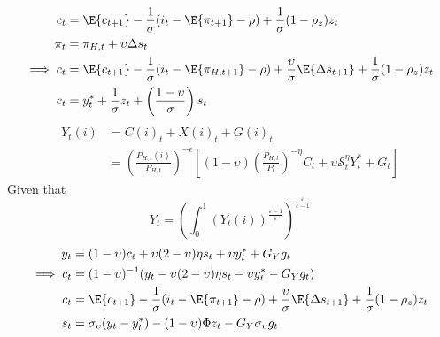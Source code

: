 \pagebreak
\begin{align}
    c_t &= \E\{ c_{t+1}\} - \frac{1}{\sigma}(i_t - \E \{ \pi_{t+1}\} - \rho) + \frac{1}{\sigma}(1-\rho_z)z_t\\
    \pi_t &= \pi_{H,t} + \upsilon \Delta s_t\\
    \implies c_t &= \E\{ c_{t+1}\} - \frac{1}{\sigma}(i_t - \E \{ \pi_{H,t+1}\} - \rho) + \frac{\upsilon}{\sigma}\E \{ \Delta s_{t+1} \} + \frac{1}{\sigma}(1-\rho_z)z_t\\
    c_t &= y_t^* + \frac{1}{\sigma}z_t + \left(\frac{1-\upsilon}{\sigma}\right)s_t
\end{align}
\begin{align}
    Y_{t}(i) &= C(i)_t + X(i)_{t} + G(i)_t \\
&=\left(\frac{P_{H,t}(i)}{P_{H,t}}\right)^{-\epsilon}\left[ (1-\upsilon)\left(\frac{P_{H,t}}{P_t}\right)^{-\eta}C_t + \upsilon \mathcal{S}_t^{\eta}Y_t^* + G_t\right]
\end{align}
Given that
\begin{equation}
    Y_t = \left( \int_{0}^{1} (Y_t(i))^{\frac{\varepsilon-1}{\varepsilon}}\right)^{\frac{\varepsilon}{\varepsilon-1}}
\end{equation}
\begin{align}
    y_t &= (1-\upsilon)c_t + \upsilon(2-\upsilon)\eta s_t + \upsilon y_t^* + G_Y g_t\\
    \implies c_t &= (1-\upsilon)^{-1}(y_t - \upsilon(2-\upsilon)\eta s_t - \upsilon y_t^* - G_Y g_t)\\
    c_t &= \E \{ c_{t+1}\} - \frac{1}{\sigma}(i_t - \E \{ \pi_{t+1}\} - \rho) + \frac{\upsilon}{\sigma}\E \{ \Delta s_{t+1} \} + \frac{1}{\sigma}(1-\rho_z)z_t \\
    s_t &= \sigma_\upsilon(y_t - y^*_t) - (1-\upsilon)\Phi z_t - G_Y \sigma_\upsilon g_t\\
\end{align}
